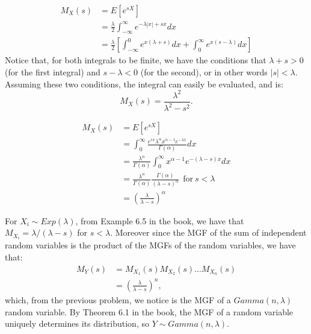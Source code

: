 \begin{problem}{9} 
\begin{align*}
M_X(s) &= E[e^{sX}] \\
& = \frac{\lambda}{2}\int_{-\infty}^\infty e^{-\lambda |x|+sx}dx \\ 
&=\frac{\lambda}{2}\left [\int_{-\infty}^0e^{x(\lambda+s)}dx+ \int_0^{\infty}e^{x(s-\lambda)}dx \right]
\end{align*}
Notice that, for both integrals to be finite, we have the conditions that $\lambda +s>0$ (for the first integral) and $s- \lambda <0$ (for the second), or in other words $|s|<\lambda$.  Assuming these two conditions, the integral can easily be evaluated, and is:
\begin{equation*}
M_X(s) = \frac{\lambda^2}{\lambda^2-s^2}.
\end{equation*}

\end{problem}

\begin{problem}{10}
\begin{align*}
M_X(s) &= E[e^{sX}] \\
& = \int_0^\infty \frac{e^{sx}\lambda^\alpha x^{\alpha-1}e^{-\lambda x}}{\Gamma(\alpha)}dx \\
& = \frac{\lambda^\alpha}{\Gamma(\alpha)}\int_0^\infty x^{\alpha-1} e^{-(\lambda-s)x}dx \\
&= \frac{\lambda^\alpha}{\Gamma(\alpha)}\frac{\Gamma(\alpha)}{(\lambda-s)^\alpha}~~\mathrm{for~} s<\lambda \\
& = \left( \frac{\lambda}{\lambda-s}\right)^\alpha
\end{align*}

\end{problem}


\begin{problem}{11} For $X_i \sim Exp(\lambda)$, from Example 6.5 in the book, we have that $M_{X_i} = \lambda/(\lambda-s)$ for $s<\lambda$.  Moreover since the MGF of the sum of independent random variables is the product of the MGFs of the random variables, we have that:
\begin{align*}
M_Y(s) &= M_{X_1}(s)M_{X_2}(s) \ldots M_{X_n}(s) \\
&=\left(\frac{\lambda}{\lambda-s}\right)^n,
\end{align*}
which, from the previous problem, we notice is the MGF of a $Gamma(n, \lambda)$ random variable.  By Theorem 6.1 in the book, the MGF of a random variable uniquely determines its distribution,
so $Y\sim Gamma(n, \lambda)$.
\end{problem}

